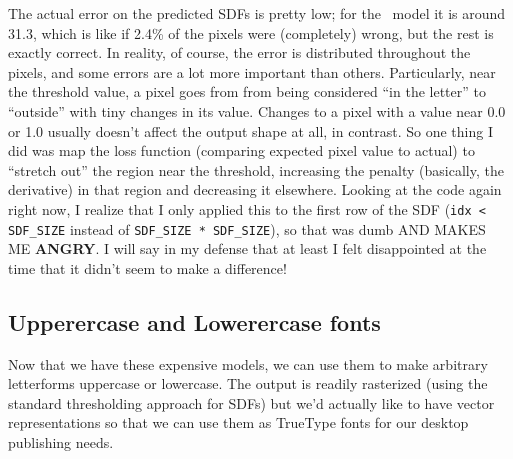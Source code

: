 \documentclass[twocolumn]{article}
\begin{document}
The actual error on the predicted SDFs is pretty low; for the
\makelowercase\ model it is around 31.3, which is like if 2.4\% of the
pixels were (completely) wrong, but the rest is exactly correct. In
reality, of course, the error is distributed throughout the pixels,
and some errors are a lot more important than others. Particularly,
near the threshold value, a pixel goes from from being considered ``in
the letter'' to ``outside'' with tiny changes in its value. Changes to
a pixel with a value near 0.0 or 1.0 usually doesn't affect the output
shape at all, in contrast. So one thing I did was map the loss
function (comparing expected pixel value to actual) to ``stretch out''
the region near the threshold, increasing the penalty (basically, the
derivative) in that region and decreasing it elsewhere. Looking at the
code again right now, I realize that I only applied this to the first
row of the SDF (\verb+idx < SDF_SIZE+ instead of
\verb+SDF_SIZE * SDF_SIZE+), so that was dumb AND MAKES ME {\bf
  ANGRY}. I will say in my defense that at least I felt disappointed
at the time that it didn't seem to make a difference!


\subsection{Upperercase and Lowerercase fonts} \label{sec:fonts}

Now that we have these expensive models, we can use them to make
arbitrary letterforms uppercase or lowercase. The output is readily
rasterized (using the standard thresholding approach for SDFs) but
we'd actually like to have vector representations so that we can
use them as TrueType fonts for our desktop publishing needs.
\end{document}
